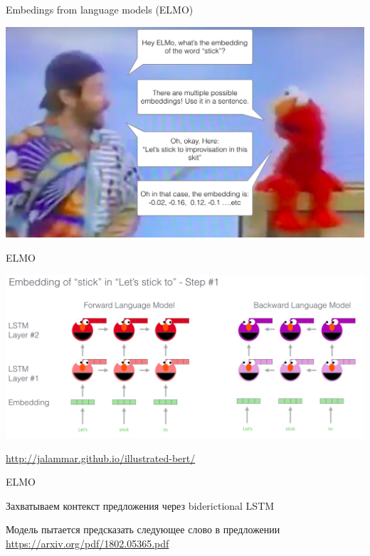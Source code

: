 \documentclass[notes,12pt, aspectratio=169]{beamer}
\newenvironment{wideitemize}{\itemize\addtolength{\itemsep}{10pt}}{\enditemize}
\begin{document}
\begin{frame}{Embedings from language models (ELMO)}
\begin{center}
	\includegraphics[width=0.9\linewidth]{elmo-embedding-robin-williams}
\end{center}
\end{frame}


\begin{frame}{ELMO}
\begin{center}
	\includegraphics[width=0.9\linewidth]{elmo_model.png}
\end{center}
\vfill
\footnotesize
{\color{blue} \url{http://jalammar.github.io/illustrated-bert/}}
\end{frame}


\begin{frame}{ELMO}
\begin{wideitemize}
	\item Захватываем контекст предложения через biderictional LSTM 
	\item Модель пытается предсказать следующее слово в предложении 
\end{wideitemize}
\vfill
\footnotesize
{\color{blue} \url{https://arxiv.org/pdf/1802.05365.pdf}}
\end{frame}
\end{document}

